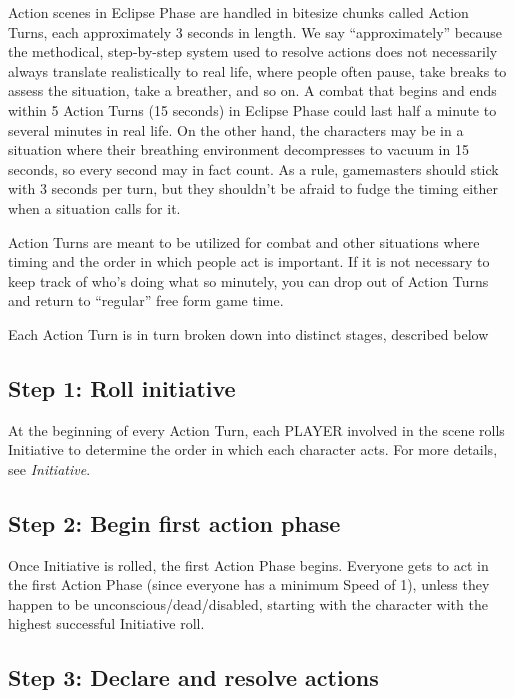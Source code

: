 Action scenes in Eclipse Phase are handled in bitesize chunks called Action Turns, each approximately 3 seconds in length. We say ``approximately'' because the methodical, step-by-step system used to resolve actions does not necessarily always translate realistically to real life, where people often pause, take breaks to assess the situation, take a breather, and so on. A combat that begins and ends within 5 Action Turns (15 seconds) in Eclipse Phase could last half a minute to several minutes in real life. On the other hand, the characters may be in a situation where their breathing environment decompresses to vacuum in 15 seconds, so every second may in fact count. As a rule, gamemasters should stick with 3 seconds per turn, but they shouldn’t be afraid to fudge the timing either when a situation calls for it. 

Action Turns are meant to be utilized for combat and other situations where timing and the order in which people act is important. If it is not necessary to keep track of who’s doing what so minutely, you can drop out of Action Turns and return to ``regular'' free form game time. 

Each Action Turn is in turn broken down into distinct stages, described below 



\subsection{Step 1: Roll initiative} \label{sec:roll-initiative} 

At the beginning of every Action Turn, each PLAYER involved in the scene rolls Initiative to determine the order in which each character acts. For more details, see \emph{Initiative}. 



\subsection{Step 2: Begin first action phase} \label{sec:begin-first-phase} 

Once Initiative is rolled, the first Action Phase begins. Everyone gets to act in the first Action Phase (since everyone has a minimum Speed of 1), unless they happen to be unconscious/dead/disabled, starting with the character with the highest successful Initiative roll. 



\subsection{Step 3: Declare and resolve actions} \label{sec:declare-resolve} 

